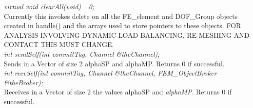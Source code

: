 {\em virtual void clearAll(void) =0;} \\
Currently this invokes delete on all the FE\_element and DOF\_Group
objects created in handle() and the arrays used to store
pointers to these objects. FOR ANALYSIS INVOLVING DYNAMIC LOAD
BALANCING, RE-MESHING AND CONTACT THIS MUST CHANGE. \\

{\em int sendSelf(int commitTag, Channel \&theChannel); } \\
Sends in a Vector of size 2 \p alphaSP and \p alphaMP. Returns
$0$ if successful. \\

{\em int recvSelf(int commitTag, Channel \&theChannel, FEM\_ObjectBroker
\&theBroker); } \\
Receives in a Vector of size 2 the values \p alphaSP and {\em
alphaMP}. Returns $0$ if successful. 
